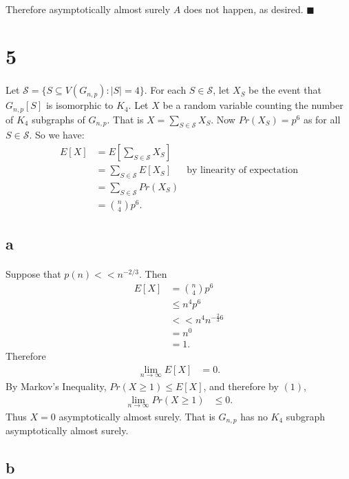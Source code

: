 \documentclass[letterpaper,12pt,oneside,onecolumn]{report}
\begin{document}
\paragraph{}
Therefore asymptotically almost surely $A$ does not happen, as desired. $\blacksquare$
\section*{5}
\paragraph{}
Let $\mathcal{S} = \{S \subseteq V(G_{n,p}) : |S| = 4\}$. For each $S \in \mathcal{S}$, let $X_S$ be the event that $G_{n,p}[S]$ is isomorphic to $K_4$. Let $X$ be a random variable counting the number of $K_4$ subgraphs of $G_{n,p}$. That is $X = \sum_{S \in \mathcal{S}} X_S$. Now $Pr(X_S) = p^6$ as for all $S \in \mathcal{S}$. So we have:
\begin{align*} 
E[X] &= E[\sum_{S \in \mathcal{S}} X_S] \\
&= \sum_{S \in \mathcal{S}} E[X_S] &\text{by linearity of expectation}\\
&= \sum_{S \in \mathcal{S}} Pr(X_S) \\
&= {n \choose 4} p^6.
\end{align*}
\subsection*{a}
\paragraph{}
Suppose that $p(n) << n^{-2/3}$. Then 
\begin{align*}
E[X] &= {n \choose 4} p^6 \\
&\leq n^4 p^6 \\
&<< n^4 n^{-\frac{2}{3}6} \\
&= n^0 \\
&= 1.
\end{align*}
Therefore 
\begin{align}
\lim_{n\to \infty}E[X] &= 0.
\end{align}
By Markov's Inequality, $Pr(X \geq 1) \leq E[X]$, and therefore by $(1)$, 
\begin{align*}
\lim_{n \to \infty}Pr(X \geq 1) &\leq 0.
\end{align*}
Thus $X = 0$ asymptotically almost surely. That is $G_{n,p}$ has no $K_4$ subgraph asymptotically almost surely.
\subsection*{b}
\end{document}
